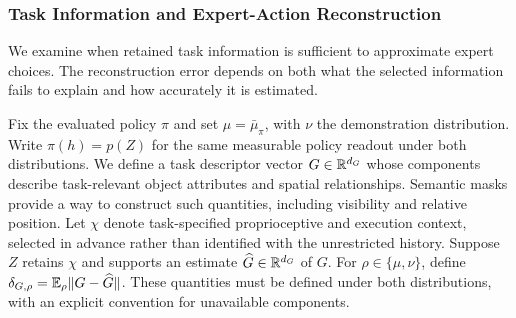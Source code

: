 \subsubsection{Task Information and Expert-Action Reconstruction}
We examine when retained task information is sufficient to approximate expert choices.
The reconstruction error depends on both what the selected information fails to explain and how accurately it is estimated.

Fix the evaluated policy $\pi$ and set $\mu=\bar\mu_\pi$, with $\nu$ the demonstration distribution.
Write $\pi(h)=p(Z)$ for the same measurable policy readout under both distributions.
We define a task descriptor vector $G\in\mathbb R^{d_G}$ whose components describe task-relevant object attributes and spatial relationships.
Semantic masks provide a way to construct such quantities, including visibility and relative position.
Let $\chi$ denote task-specified proprioceptive and execution context, selected in advance rather than identified with the unrestricted history.
Suppose $Z$ retains $\chi$ and supports an estimate $\widehat G\in\mathbb R^{d_G}$ of $G$.
For $\rho\in\{\mu,\nu\}$, define $\delta_{G,\rho}=\mathbb E_\rho\lVert G-\widehat G\rVert$.
These quantities must be defined under both distributions, with an explicit convention for unavailable components.

